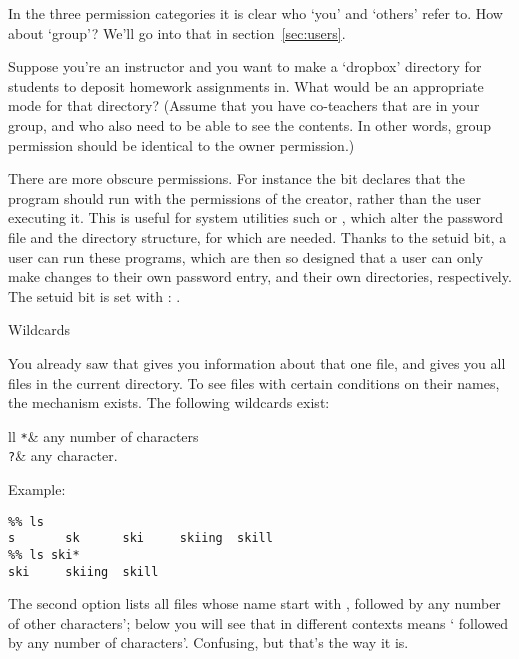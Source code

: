 In the three permission categories it is clear who `you' and `others'
refer to. How about `group'? We'll go into that in section~\ref{sec:users}.

\begin{exercise}
  Suppose you're an instructor and you want to make a `dropbox'
  directory for students to deposit homework assignments in.
  What would be an appropriate mode for that directory?
  (Assume that you have co-teachers that are in your group,
  and who also need to be able to see the contents. In other words,
  group permission should be identical to the owner permission.)
\end{exercise}


\begin{remark}
  There are more obscure permissions. For instance the
   bit declares that the program should run with the
  permissions of the creator, rather than the user executing it. This
  is useful for system utilities such  or , which
  alter the password file and the directory structure, for which
   are needed. Thanks to the setuid
  bit, a user can run these programs, which are then so designed that
  a user can only make changes to their own password entry, and their
  own directories, respectively. The setuid bit is set with
  : .
\end{remark}

 {Wildcards}
\label{sec:shell-wildcard}

You already saw that  gives you information about that
one file, and  gives you all files in the current directory. To
see files with certain conditions on their names, the
 mechanism exists. The following wildcards exist:

\begin{fntable}{ll}
  \verb+*+& any number of characters\\
  \verb+?+& any character.\\
\end{fntable}

Example:
\begin{lstlisting}
%% ls
s       sk      ski     skiing  skill
%% ls ski*
ski     skiing  skill
\end{lstlisting}
The second option lists all files whose name start with
, followed by any number of other characters'; below you will
see that in different contexts  means ` followed by any
number of  characters'. Confusing, but that's the way it is.

